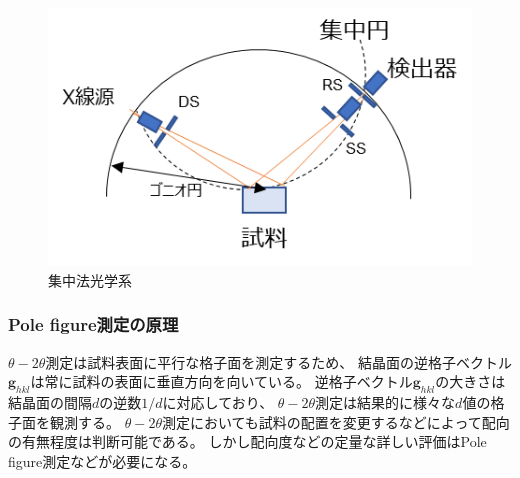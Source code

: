 \documentclass[dvipdfmx,12pt,a4paper]{jreport}
\begin{document}
			\begin{figure}[h]
				\centering
				\includegraphics[scale=1.3]{XRD_theta_2theta_光学系.png}
				\caption{集中法光学系}
				\label{集中法光学系}
			\end{figure}

			\subsubsection{Pole figure測定の原理}
			$\theta-2\theta$測定は試料表面に平行な格子面を測定するため、
			結晶面の逆格子ベクトル$\bm{g}_{hkl}$は常に試料の表面に垂直方向を向いている。
			逆格子ベクトル$\bm{g}_{hkl}$の大きさは結晶面の間隔$d$の逆数$1/d$に対応しており、
			$\theta-2\theta$測定は結果的に様々な$d$値の格子面を観測する。
			$\theta-2\theta$測定においても試料の配置を変更するなどによって配向の有無程度は判断可能である。
			しかし配向度などの定量な詳しい評価はPole figure測定などが必要になる。
			
\end{document}
